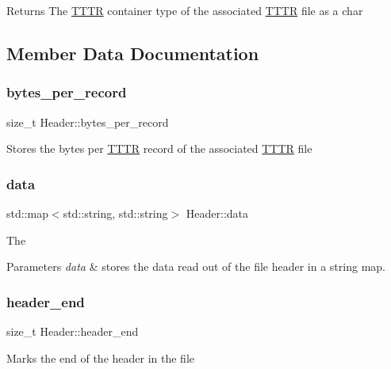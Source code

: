 \begin{DoxyReturn}{Returns}
The \hyperlink{class_t_t_t_r}{T\+T\+TR} container type of the associated \hyperlink{class_t_t_t_r}{T\+T\+TR} file as a char 
\end{DoxyReturn}


\subsection{Member Data Documentation}
\mbox{\label{class_header_aa56d9a3159e45e4baa326b6b360e2c2d}} 
\subsubsection{\texorpdfstring{bytes\+\_\+per\+\_\+record}{bytes\_per\_record}}
{\footnotesize\ttfamily size\+\_\+t Header\+::bytes\+\_\+per\+\_\+record}

Stores the bytes per \hyperlink{class_t_t_t_r}{T\+T\+TR} record of the associated \hyperlink{class_t_t_t_r}{T\+T\+TR} file \mbox{\label{class_header_a4a13dbd471798b9dcc7eba5a8ffcfd98}} 
\subsubsection{\texorpdfstring{data}{data}}
{\footnotesize\ttfamily std\+::map$<$std\+::string, std\+::string$>$ Header\+::data}

The 
\begin{DoxyParams}{Parameters}
{\em data} & stores the data read out of the file header in a string map. \\
\hline
\end{DoxyParams}
\mbox{\label{class_header_a8eb66d0a52e07e3176173ea9fc8f4aa2}} 
\subsubsection{\texorpdfstring{header\+\_\+end}{header\_end}}
{\footnotesize\ttfamily size\+\_\+t Header\+::header\+\_\+end}

Marks the end of the header in the file \mbox{\label{class_header_ab35b96124528a2a4970f9a091eaea1e0}} 
